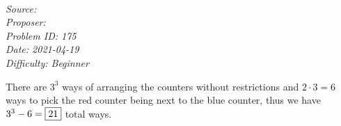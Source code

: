 
\SSbreak\\
\emph{Source: \Cfolk}\\
\emph{Proposer: \Pss}\\
\emph{Problem ID: 175}\\
\emph{Date: 2021-04-19}\\
\emph{Difficulty: Beginner}\\
\SSbreak
 
\bigskip

\begin{solution}\hfil\medskip

    There are \(3^3\) ways of arranging the counters without restrictions and \(2\cdot3=6\) ways to pick the red counter being next to the blue counter, thus we have \(3^3-6=\fbox{21}\) total ways.

\end{solution}\bigskip
